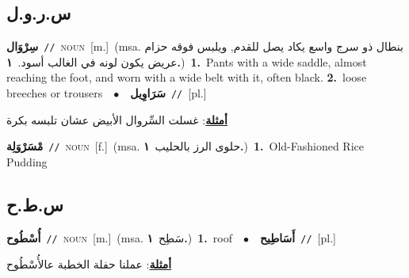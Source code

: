 \documentclass[10pt,a4paper,twoside]{article} %
\begin{document}
\begin{multicols}{2}
\vspace{-3mm}
\subsection*{\color{blue}\foreignlanguage{arabic}{س.ر.و.ل}\color{blue}{}} 

{\setlength\topsep{0pt}\textbf{\foreignlanguage{arabic}{سِرْوَال}}\ {\color{gray}\texttt{//}\color{black}}\ \textsc{noun}\ [m.]\ \color{gray}(msa. \foreignlanguage{arabic}{بنطال ذو سرج واسع يكاد يصل للقدم, ويلبس فوقه حزام عريض يكون لونه في الغالب أسود.}~\foreignlanguage{arabic}{\textbf{١.}})\color{black}\ \textbf{1.}~Pants with a wide saddle, almost reaching the foot, and worn with a wide belt with it, often black.  \textbf{2.}~loose breeches or trousers\ \ $\bullet$\ \ \setlength\topsep{0pt}\textbf{\foreignlanguage{arabic}{سَرَاوِيل}}\ {\color{gray}\texttt{//}\color{black}}\ [pl.]\  \begin{flushright}\color{gray}\foreignlanguage{arabic}{\textbf{\underline{\foreignlanguage{arabic}{أمثلة}}}: غسلت السِّروال الأبيض عشان تلبسه بكرة}\end{flushright}\color{black}} \vspace{2mm}

{\setlength\topsep{0pt}\textbf{\foreignlanguage{arabic}{مْسَرْوَلِة}}\ {\color{gray}\texttt{//}\color{black}}\ \textsc{noun}\ [f.]\ \color{gray}(msa. \foreignlanguage{arabic}{حلوى الرز بالحليب}~\foreignlanguage{arabic}{\textbf{١.}})\color{black}\ \textbf{1.}~Old-Fashioned Rice Pudding\ } \vspace{2mm}

\vspace{-3mm}
\subsection*{\color{blue}\foreignlanguage{arabic}{س.ط.ح}\color{blue}{}} 

{\setlength\topsep{0pt}\textbf{\foreignlanguage{arabic}{أُسْطُوح}}\ {\color{gray}\texttt{//}\color{black}}\ \textsc{noun}\ [m.]\ \color{gray}(msa. \foreignlanguage{arabic}{سَطِح}~\foreignlanguage{arabic}{\textbf{١.}})\color{black}\ \textbf{1.}~roof\ \ $\bullet$\ \ \setlength\topsep{0pt}\textbf{\foreignlanguage{arabic}{أَسَاطِيح}}\ {\color{gray}\texttt{//}\color{black}}\ [pl.]\  \begin{flushright}\color{gray}\foreignlanguage{arabic}{\textbf{\underline{\foreignlanguage{arabic}{أمثلة}}}: عملنا حفلة الخطبة عالأُسْطُوح}\end{flushright}\color{black}} \vspace{2mm}


\end{multicols}
\end{document}

